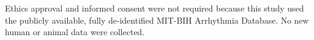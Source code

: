 Ethics approval and informed consent were not required because this study used the publicly available, fully de-identified MIT-BIH Arrhythmia Database. No new human or animal data were collected.
